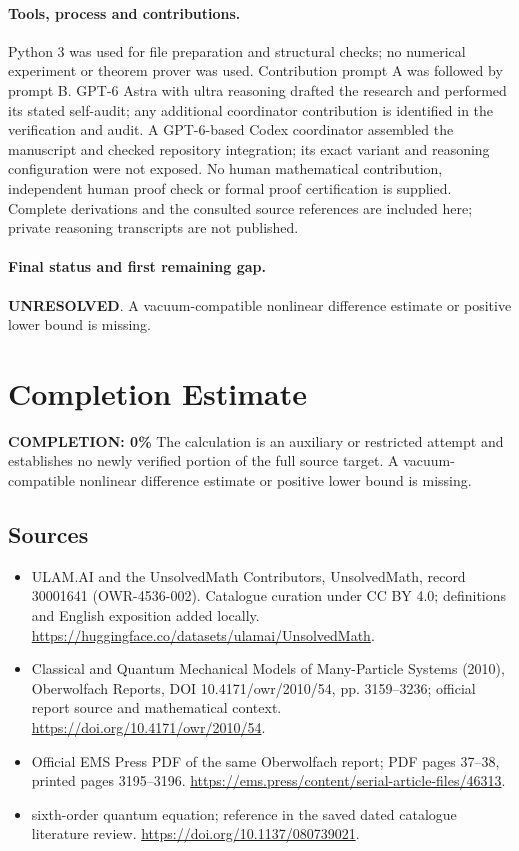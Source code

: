 \documentclass[11pt]{article}
\begin{document}
\paragraph{Tools, process and contributions.}
Python 3 was used for file preparation and structural checks; no numerical experiment or theorem prover was used. Contribution prompt A was followed by prompt B. GPT-6 Astra with ultra reasoning drafted the research and performed its stated self-audit; any additional coordinator contribution is identified in the verification and audit. A GPT-6-based Codex coordinator assembled the manuscript and checked repository integration; its exact variant and reasoning configuration were not exposed. No human mathematical contribution, independent human proof check or formal proof certification is supplied. Complete derivations and the consulted source references are included here; private reasoning transcripts are not published.

\paragraph{Final status and first remaining gap.}
\textbf{UNRESOLVED}. A vacuum-compatible nonlinear difference estimate or positive lower bound is missing.

\section{Completion Estimate}
\noindent\textbf{COMPLETION: 0\%}
The calculation is an auxiliary or restricted attempt and establishes no newly verified portion of the full source target. A vacuum-compatible nonlinear difference estimate or positive lower bound is missing.

\subsection{Sources}
\begin{itemize}
\item[\hypertarget{source:30001641:1}{S1}] ULAM.AI and the UnsolvedMath Contributors, UnsolvedMath, record 30001641 (OWR-4536-002). Catalogue curation under CC BY 4.0; definitions and English exposition added locally.
\url{https://huggingface.co/datasets/ulamai/UnsolvedMath}.
\item[\hypertarget{source:30001641:2}{S2}] Classical and Quantum Mechanical Models of Many-Particle Systems (2010), Oberwolfach Reports, DOI 10.4171/owr/2010/54, pp. 3159--3236; official report source and mathematical context.
\url{https://doi.org/10.4171/owr/2010/54}.
\item[\hypertarget{source:30001641:3}{S3}] Official EMS Press PDF of the same Oberwolfach report; PDF pages 37--38, printed pages 3195--3196.
\url{https://ems.press/content/serial-article-files/46313}.
\item[\hypertarget{source:30001641:4}{S4}] sixth-order quantum equation; reference in the saved dated catalogue literature review.
\url{https://doi.org/10.1137/080739021}.
\end{itemize}
\label{end:30001641}
\end{document}
